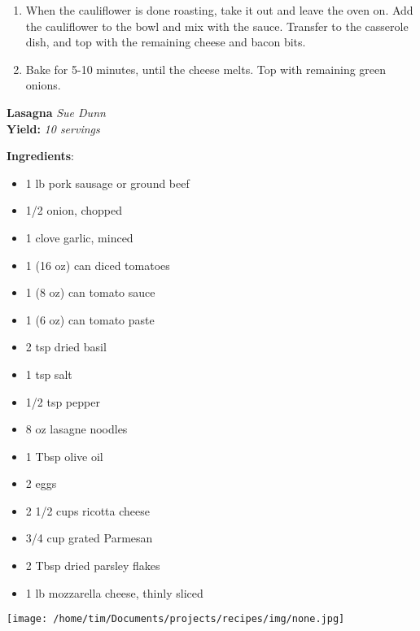 \documentclass[11pt, twoside, openany]{book}
\begin{document}
\begin{minipage}[t]{\linewidth}
\begin{enumerate}
\item When the cauliflower is done roasting, take it out and leave the oven on. Add the cauliflower to the bowl and mix with the sauce. Transfer to the casserole dish, and top with the remaining cheese and bacon bits.
\item Bake for 5-10 minutes, until the cheese melts. Top with remaining green onions.
\end{enumerate}
\end{minipage}\vspace{8mm}
\noindent\begin{minipage}[t]{\linewidth}%
{\Large\textbf{Lasagna}} \label{lasagna}\hfill\textit{Sue Dunn}\\
\textbf{Yield:} \textit{10 servings}\\
\noindent\begin{minipage}[t]{0.78\linewidth}%
\textbf{Ingredients}:\vspace{-3mm}
\begin{multicols}{2}
\begin{itemize}\setlength\itemsep{-1mm}
\item 1 lb pork sausage or ground beef
\item 1/2 onion, chopped
\item 1 clove garlic, minced
\item 1 (16 oz) can diced tomatoes
\item 1 (8 oz) can tomato sauce
\item 1 (6 oz) can tomato paste
\item 2 tsp dried basil
\item 1 tsp salt
\item 1/2 tsp pepper
\item 8 oz lasagne noodles
\item 1 Tbsp olive oil
\item 2 eggs
\item 2 1/2 cups ricotta cheese
\item 3/4 cup grated Parmesan
\item 2 Tbsp dried parsley flakes
\item 1 lb mozzarella cheese, thinly sliced
\end{itemize}
\end{multicols}
\end{minipage}
\noindent\begin{minipage}[t]{0.18\linewidth}
\centering \strut\vspace*{-\baselineskip}\newline
\texttt{[image: /home/tim/Documents/projects/recipes/img/none.jpg]}\\

\end{minipage}
\end{minipage}
\end{document}
